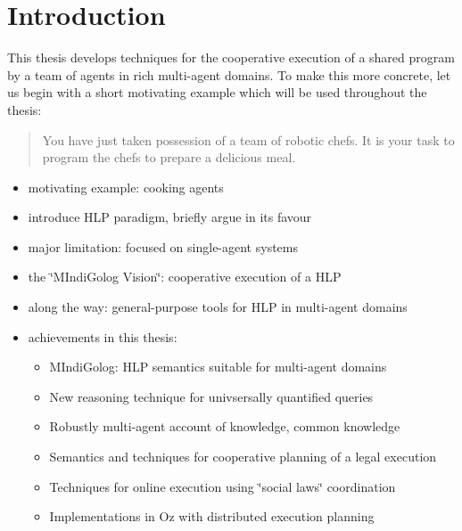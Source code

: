 
\chapter{Introduction}



This thesis develops techniques for the cooperative execution of a
shared program by a team of agents in rich multi-agent domains. To
make this more concrete, let us begin with a short motivating example
which will be used throughout the thesis:

\begin{quote}
You have just taken possession of a team of robotic chefs. It is your
task to program the chefs to prepare a delicious meal. 
\end{quote}
\begin{itemize}
\item motivating example: cooking agents 
\item introduce HLP paradigm, briefly argue in its favour 
\item major limitation: focused on single-agent systems 
\item the \char`\"{}MIndiGolog Vision\char`\"{}: cooperative execution of
a HLP 
\item along the way: general-purpose tools for HLP in multi-agent domains 
\item achievements in this thesis:

\begin{itemize}
\item MIndiGolog: HLP semantics suitable for multi-agent domains 
\item New reasoning technique for univsersally quantified queries 
\item Robustly multi-agent account of knowledge, common knowledge 
\item Semantics and techniques for cooperative planning of a legal execution 
\item Techniques for online execution using \char`\"{}social laws\char`\"{}
coordination 
\item Implementations in Oz with distributed execution planning 
\end{itemize}
\end{itemize}


